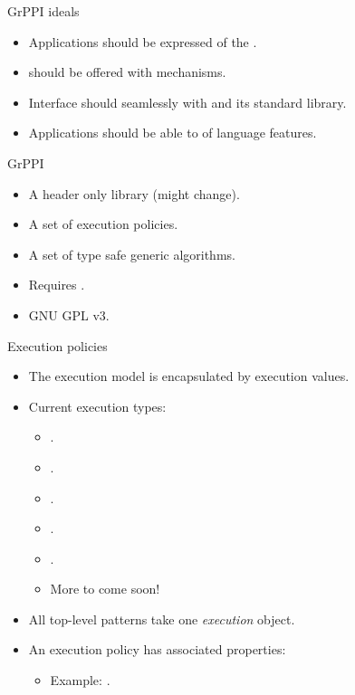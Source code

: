 \begin{frame}[t]{GrPPI ideals}
\begin{itemize}[<+->]
  \item Applications should be expressed  of the
        .
  \vfill
  \item {} should be offered with 
        mechanisms.
  \vfill
  \item Interface should  seamlessly with  and
        its standard library.
  \vfill
  \item Applications should be able to  of  language features.
\end{itemize}
\end{frame}

\begin{frame}[t]{GrPPI}
\begin{Large}
\end{Large}
\vfill\pause
\begin{itemize}
  \item A header only library (might change).
  \item A set of execution policies.
  \item A set of type safe generic algorithms.
  \item Requires .
  \item GNU GPL v3.
\end{itemize}
\end{frame}

\begin{frame}[t]{Execution policies}
\begin{itemize}
  \item The execution model is encapsulated by execution values.
  \vfill
  \item Current execution types:
    \begin{itemize}
      \item {}.
      \item {}.
      \item {}.
      \item {}.
      \item {}.
      \item More to come soon!
    \end{itemize}
  \vfill
  \item All top-level patterns take one \emph{execution} object.
  \vfill
  \item An execution policy has associated properties:
    \begin{itemize}
      \item Example: .
    \end{itemize}
\end{itemize}
\end{frame}

